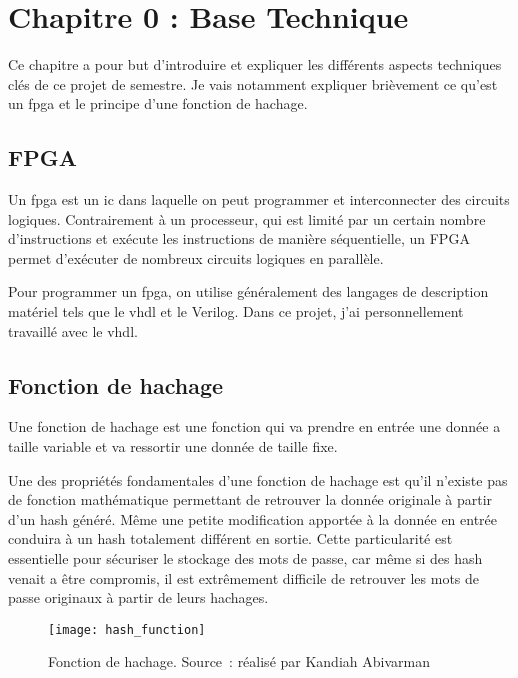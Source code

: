 \chapter{Chapitre 0 : Base Technique}

Ce chapitre a pour but d'introduire et expliquer les différents aspects techniques clés de ce projet de semestre. Je vais notamment expliquer brièvement ce qu'est un \gls{fpga} et le principe d'une fonction de hachage.

\section{FPGA}
Un \gls{fpga} est un \gls{ic} dans laquelle on peut programmer et interconnecter des circuits logiques. Contrairement à un processeur, qui est limité par un certain nombre d'instructions et exécute les instructions de manière séquentielle, un FPGA permet d'exécuter de nombreux circuits logiques en parallèle.

Pour programmer un \gls{fpga}, on utilise généralement des langages de description matériel tels que le \gls{vhdl} et le Verilog. Dans ce projet, j'ai personnellement travaillé avec le \gls{vhdl}. 

\section{Fonction de hachage}

Une fonction de hachage est une fonction qui va prendre en entrée une donnée a taille variable et va ressortir une donnée de taille fixe. 

Une des propriétés fondamentales d'une fonction de hachage est qu'il n'existe pas de fonction mathématique permettant de retrouver la donnée originale à partir d'un hash généré. Même une petite modification apportée à la donnée en entrée conduira à un hash totalement différent en sortie. Cette particularité est essentielle pour sécuriser le stockage des mots de passe, car même si des hash venait a être compromis, il est extrêmement difficile de retrouver les mots de passe originaux à partir de leurs hachages.

\newpage

\begin{figure}[tbph!]
	\centering
	\texttt{[image: hash\_function]}
	\caption[Fonction de hachage]{Fonction de hachage. Source : réalisé par Kandiah Abivarman}
	\label{fig:fonction_hachage}
\end{figure}


